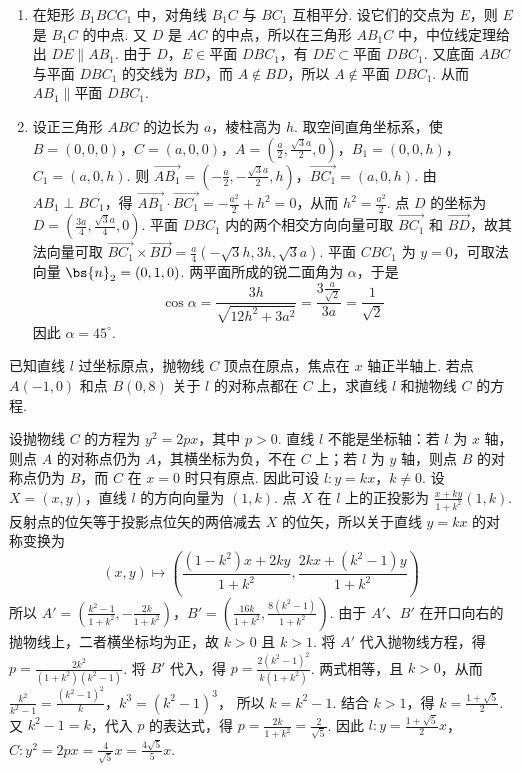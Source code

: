 \begin{solution}
\begin{enumerate}
\item 在矩形 \(B_1BCC_1\) 中，对角线 \(B_1C\) 与 \(BC_1\) 互相平分. 设它们的交点为 \(E\)，则 \(E\) 是 \(B_1C\) 的中点. 又 \(D\) 是 \(AC\) 的中点，所以在三角形 \(AB_1C\) 中，中位线定理给出 \(DE\parallel AB_1\).
由于 \(D\)，\(E\in\text{平面 }DBC_1\)，有 \(DE\subset\text{平面 }DBC_1\). 又底面 \(ABC\) 与平面 \(DBC_1\) 的交线为 \(BD\)，而 \(A\notin BD\)，所以 \(A\notin\text{平面 }DBC_1\). 从而
\(AB_1\parallel\text{平面 }DBC_1\).
\item 设正三角形 \(ABC\) 的边长为 \(a\)，棱柱高为 \(h\). 取空间直角坐标系，使
\(B=(0,0,0)\)，\(C=(a,0,0)\)，\(A=\left(\frac a2,\frac{\sqrt3a}{2},0\right)\)，\(B_1=(0,0,h)\)，\(C_1=(a,0,h)\). 则 \(\overrightarrow{AB_1}=\left(-\frac a2,-\frac{\sqrt3a}{2},h\right)\)，\(\overrightarrow{BC_1}=(a,0,h)\).
由 \(AB_1\perp BC_1\)，得 \(\overrightarrow{AB_1}\cdot\overrightarrow{BC_1}=-\frac{a^2}{2}+h^2=0\)，从而 \(h^2=\frac{a^2}{2}\).
点 \(D\) 的坐标为 \(D=\left(\frac{3a}{4},\frac{\sqrt3a}{4},0\right)\).
平面 \(DBC_1\) 内的两个相交方向向量可取 \(\overrightarrow{BC_1}\) 和 \(\overrightarrow{BD}\)，故其法向量可取
\(\overrightarrow{BC_1}\times\overrightarrow{BD}=\frac a4\left(-\sqrt3h,3h,\sqrt3a\right)\).
平面 \(CBC_1\) 为 \(y=0\)，可取法向量 \(\bs{n}_2=(0,1,0)\). 两平面所成的锐二面角为 \(\alpha\)，于是
\[
\cos\alpha
=\frac{3h}{\sqrt{12h^2+3a^2}}
=\frac{3\frac{a}{\sqrt2}}{3a}
=\frac{1}{\sqrt2}
\]
因此 \(\alpha=45^\circ\).
\end{enumerate}
\end{solution}

\begin{problem}
已知直线 \(l\) 过坐标原点，抛物线 \(C\) 顶点在原点，焦点在 \(x\) 轴正半轴上. 若点 \(A(-1,0)\) 和点 \(B(0,8)\) 关于 \(l\) 的对称点都在 \(C\) 上，求直线 \(l\) 和抛物线 \(C\) 的方程.
\end{problem}

\begin{solution}
设抛物线 \(C\) 的方程为 \(y^2=2px\)，其中 \(p>0\). 直线 \(l\) 不能是坐标轴：若 \(l\) 为 \(x\) 轴，则点 \(A\) 的对称点仍为 \(A\)，其横坐标为负，不在 \(C\) 上；若 \(l\) 为 \(y\) 轴，则点 \(B\) 的对称点仍为 \(B\)，而 \(C\) 在 \(x=0\) 时只有原点. 因此可设
\(l:y=kx\)，\(k\neq0\).
设 \(X=(x,y)\)，直线 \(l\) 的方向向量为 \((1,k)\). 点 \(X\) 在 \(l\) 上的正投影为
\(\frac{x+ky}{1+k^2}(1,k)\).
反射点的位矢等于投影点位矢的两倍减去 \(X\) 的位矢，所以关于直线 \(y=kx\) 的对称变换为
\[
(x,y)\longmapsto
\left(\frac{(1-k^2)x+2ky}{1+k^2},
\frac{2kx+(k^2-1)y}{1+k^2}\right)
\]
所以 \(A'=\left(\frac{k^2-1}{1+k^2},-\frac{2k}{1+k^2}\right)\)，\(B'=\left(\frac{16k}{1+k^2},\frac{8(k^2-1)}{1+k^2}\right)\).
由于 \(A'\)、\(B'\) 在开口向右的抛物线上，二者横坐标均为正，故 \(k>0\) 且 \(k>1\). 将 \(A'\) 代入抛物线方程，得
\(p=\frac{2k^2}{(1+k^2)(k^2-1)}\).
将 \(B'\) 代入，得
\(p=\frac{2(k^2-1)^2}{k(1+k^2)}\).
两式相等，且 \(k>0\)，从而
\(\frac{k^2}{k^2-1}=\frac{(k^2-1)^2}{k}\)，\(k^3=(k^2-1)^3\)，
所以 \(k=k^2-1\). 结合 \(k>1\)，得 \(k=\frac{1+\sqrt5}{2}\).
又 \(k^2-1=k\)，代入 \(p\) 的表达式，得
\(p=\frac{2k}{1+k^2}=\frac{2}{\sqrt5}\). 因此 \(l:y=\frac{1+\sqrt5}{2}x\)，\(C:y^2=2px=\frac{4}{\sqrt5}x=\frac{4\sqrt5}{5}x\).
\end{solution}

